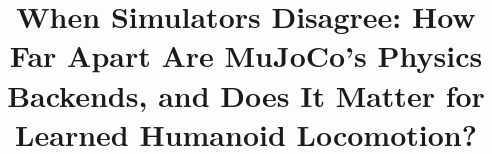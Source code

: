 \documentclass[conference]{IEEEtran}
\begin{document}
%
%
%
\title{When Simulators Disagree: How Far Apart Are MuJoCo's Physics\\
Backends, and Does It Matter for Learned Humanoid Locomotion?}

\author{
}

\maketitle
\end{document}
